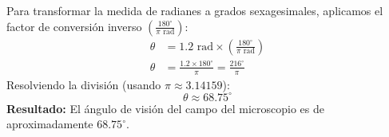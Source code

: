 \documentclass[12pt]{article}
\begin{document}
\begin{tcolorbox}
    \vspace{0.4cm}
    \begin{tcolorbox}[colback=medteal!10, colframe=medteal, arc=2mm, boxrule=1.2pt, title=\textbf{Desarrollo Matemático y Solución}]
        Para transformar la medida de radianes a grados sexagesimales, aplicamos el factor de conversión inverso \textbf{$\left(\frac{180^\circ}{\pi \text{ rad}}\right)$}:
        \begin{align*}
            \theta &= 1.2 \text{ rad} \times \left( \frac{180^\circ}{\pi \text{ rad}} \right) \\[1ex]
            \theta &= \frac{1.2 \times 180^\circ}{\pi} = \frac{216^\circ}{\pi}
        \end{align*}
        Resolviendo la división (usando $\pi \approx 3.14159$):
        \[ \theta \approx 68.75^\circ \]
        \textbf{Resultado:} El ángulo de visión del campo del microscopio es de aproximadamente \textbf{$68.75^\circ$}.
    \end{tcolorbox}
    
\end{tcolorbox}
\end{document}
